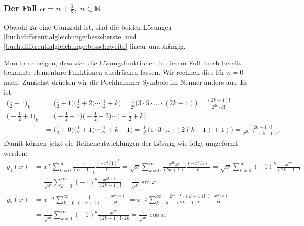 %
%
\subsubsection{Der Fall $\alpha=n+\frac12$, $n\in\mathbb{N}$}
Obwohl $2\alpha$ eine Ganzzahl ist, sind die beiden Lösungen
\eqref{buch:differentialgleichunge:bessel:erste}
und
\eqref{buch:differentialgleichunge:bessel:zweite}
linear unabhängig.

Man kann zeigen, dass sich die Lösungsfunktionen in diesem Fall
durch bereits bekannte elementare Funktionen ausdrücken lassen.
Wir rechnen dies für $n=0$ nach.
Zunächst drücken wir die Pochhammer-Symbole im Nenner anders aus.
Es ist
\begin{align*}
\biggl(\frac12 + 1\biggr)_k
&=
\biggl(\frac12 + 1\biggr)
\biggl(\frac12 + 2\biggr)
\cdots
\biggl(\frac12 + k\biggr)
=
\frac{1}{2^k}\bigl(3\cdot 5\cdot\ldots\cdot (2k+1)\bigr)
=
\frac{(2k+1)!}{2^{2k}\cdot k!}
\\
\biggl(-\frac12 + 1\biggr)_k
&=
\biggl(-\frac12 + 1\biggr)
\biggl(-\frac12 + 2\biggr)
\cdots
\biggl(-\frac12 + k\biggr)
\\
&=
\biggl(\frac12 + 0\biggr)
\biggl(\frac12 + 1\biggr)
\cdots
\biggl(\frac12 + k-1\biggr)
=
\frac{1}{2^k}\bigl(1\cdot 3 \cdot\ldots\cdot (2(k-1)+1)\bigr)
=
\frac{(2k-1)!}{2^{2k-1}\cdot (k-1)!}.
\end{align*}
Damit können jetzt die Reihenentwicklungen der Lösung wie folgt
umgeformt werden:
\begin{align*}
y_1(x)
&=
x^\alpha
\sum_{k=0}^\infty
\frac{1}{(\alpha+1)_k}
\frac{(-x^2/4)^k}{k!}
=
\sqrt{x}
\sum_{k=0}^\infty
\frac{2^{2k}k!}{(2k+1)!}
\frac{(-x^2/4)^k}{k!}
=
\sqrt{x}
\sum_{k=0}^\infty
(-1)^k
\frac{x^{2k}}{(2k+1)!}
\\
&=
\frac{1}{\sqrt{x}}
\sum_{k=0}^\infty
(-1)^k
\frac{x^{2k+1}}{(2k+1)!}
=
\frac{1}{\sqrt{x}} \sin x
\\
y_2(x)
&=
x^{-\alpha}
\sum_{k=0}^\infty
\frac{1}{(-\alpha+1)_k}
\frac{(-x^2/4)^k}{k!}
=
x^{-\frac12}
\sum_{k=0}^\infty
\frac{2^{2k-1}\cdot (k-1)!}{(2k-1)!}
\frac{(-x^2/4)^k}{k!}
\\
&=
\frac{1}{\sqrt{x}}
\sum_{k=0}^\infty
(-1)^k
\frac{x^{2k}}{(2k-1)!\cdot 2k}
=
\frac{1}{\sqrt{x}} \cos x.
\end{align*}

